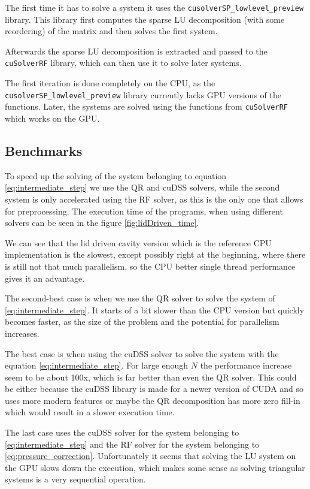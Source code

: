\documentclass{article}
\begin{document}
The first time 
it has to solve a system it uses the \verb|cusolverSP_lowlevel_preview| library. This library 
first computes the sparse LU decomposition (with some reordering) of the matrix and then solves the 
first system.

Afterwards the sparse LU  decomposition is extracted and passed to the \verb|cuSolverRF| library,
which can then use it to solve later systems.

The first iteration is done completely on the CPU, as the \verb|cusolverSP_lowlevel_preview| library
currently lacks GPU versions of the functions. Later, the systems are solved using the functions 
from \verb|cuSolverRF| which works on the GPU.

\subsection{Benchmarks}
To speed up the solving of the system belonging to equation \ref{eq:intermediate_step} we use 
the QR and cuDSS solvers, while
the second system is only accelerated using the RF solver, as this is the only one that allows 
for preprocessing. 
The execution time of the programs, when using different solvers can be seen in the
figure \ref{fig:lidDriven_time}.

We can see that the lid driven cavity version which is the reference CPU implementation 
is the slowest, except possibly right at the beginning, where there is still not that much 
parallelism, so the CPU better single thread performance gives it an advantage. 

The second-best case is when we use the QR solver to solve the system of \ref{eq:intermediate_step}.
It starts of a bit slower than the CPU version but quickly becomes faster, as the 
size of the problem and the potential for parallelism increases.

The best case is when using the cuDSS solver to solve the system with the equation 
\ref{eq:intermediate_step}. For large 
enough \(N\) the performance increase seem to be about 100x, which is far better than even 
the QR solver. This could be either because the cuDSS library is made for a newer version of 
CUDA and so uses more modern features or maybe the QR decomposition has more zero fill-in
which would result in a slower execution time. 

The last case uses the cuDSS solver for the system belonging to \ref{eq:intermediate_step} 
and the RF solver for the system belonging to \ref{eq:pressure_correction}. 
Unfortunately it seems that solving the LU system on the GPU slows down the execution, 
which makes some sense as solving triangular systems is a very sequential operation.
\end{document}

